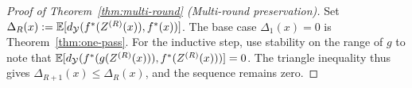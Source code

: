 

\begin{proof}[Proof of Theorem~\ref{thm:multi-round} (Multi-round preservation)]
\label{proof:thm-multi-round}
Set $\Delta_R(x):=\mathbb{E}[d_{\mathcal{Y}}(f^{\ast}(Z^{(R)}(x)),f^{\ast}(x))]$. The base case $\Delta_1(x)=0$ is Theorem~\ref{thm:one-pass}. For the inductive step, use stability on the range of $g$ to note that $\mathbb{E}[d_{\mathcal{Y}}(f^{\ast}(g(Z^{(R)}(x))),f^{\ast}(Z^{(R)}(x)))] = 0$. The triangle inequality thus gives $\Delta_{R+1}(x)\le \Delta_R(x)$, and the sequence remains zero.
\end{proof}

